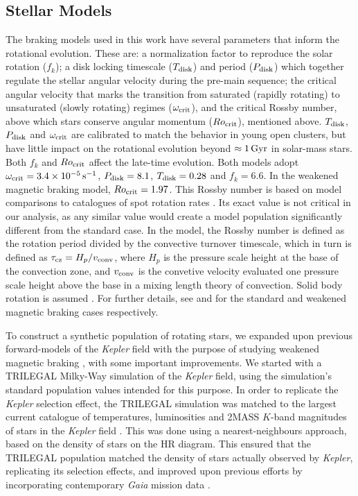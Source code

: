 \documentclass[12pt]{article}
\newcommand{\kepler}{\emph{Kepler}\xspace}
\newcommand{\rtwo}[1]{{#1}}
\begin{document}
\subsection{Stellar Models}\label{ssec:models}
The braking models used in this work have several parameters that inform the rotational evolution. These are: a normalization factor to reproduce the solar rotation ($f_k$); a disk locking timescale ($T_{\rm disk}$) and period ($P_{\rm disk}$) which together regulate the stellar angular velocity during the pre-main sequence; the critical angular velocity that marks the transition from saturated (rapidly rotating) to unsaturated (slowly rotating) regimes ($\omega_{\rm crit}$), and the critical Rossby number, above which stars conserve angular momentum ($Ro_{\rm crit}$), mentioned above. $T_{\rm disk}$, $P_{\rm disk}$ and $\omega_{\rm crit}$ are calibrated to match the behavior in young open clusters, but have little impact on the rotational evolution beyond $\approx 1\, \rm{Gyr}$ in solar-mass stars. Both $f_k$ and $Ro_{\rm crit}$ affect the late-time evolution. Both models adopt $\omega_{\rm crit} = 3.4  \times 10^{-5}\, \rm{s}^{-1}$, $P_{\rm disk} = 8.1$, $T_{\rm disk} = 0.28$ and $f_k = 6.6$. In the weakened magnetic braking model, $Ro_{\rm crit} = 1.97$. \rtwo{This Rossby number is based on model comparisons to catalogues of spot rotation rates \cite{vansaders+2019}. Its exact value is not critical in our analysis, as any similar value would create a model population significantly different from the standard case. In the model, the Rossby number is defined as the rotation period divided by the convective turnover timescale, which in turn is defined as $\tau_{\rm cz} = H_p / v_{\rm conv}$, where $H_p$ is the pressure scale height at the base of the convection zone, and $v_{\rm conv}$ is the convetive velocity evaluated one pressure scale height above the base in a mixing length theory of convection. Solid body rotation is assumed \cite{nielsen+2015}.} For further details, see \cite{vansaders+pinsonneault2013} and \cite{vansaders+2016, vansaders+2019} for the standard and weakened magnetic braking cases respectively.

To construct a synthetic population of rotating stars, we expanded upon previous forward-models of the \textit{Kepler} field with the purpose of studying weakened magnetic braking \cite{vansaders+2019}, with some important improvements. We started with a TRILEGAL \cite{girardi+2012} Milky-Way simulation of the \kepler field, using the simulation's standard population values intended for this purpose. In order to replicate the \kepler selection effect, the TRILEGAL simulation was matched to the largest current catalogue of temperatures, luminosities and 2MASS $K$-band magnitudes of stars in the \kepler field \cite{berger+2020}. This was done using a nearest-neighbours approach, based on the density of stars on the HR diagram. This ensured that the TRILEGAL population matched the density of stars actually observed by \kepler, replicating its selection effects, and improved upon previous efforts \cite{vansaders+2019} by incorporating contemporary \textit{Gaia} mission data \cite{gaiacollaboration+2018}.
\end{document}
